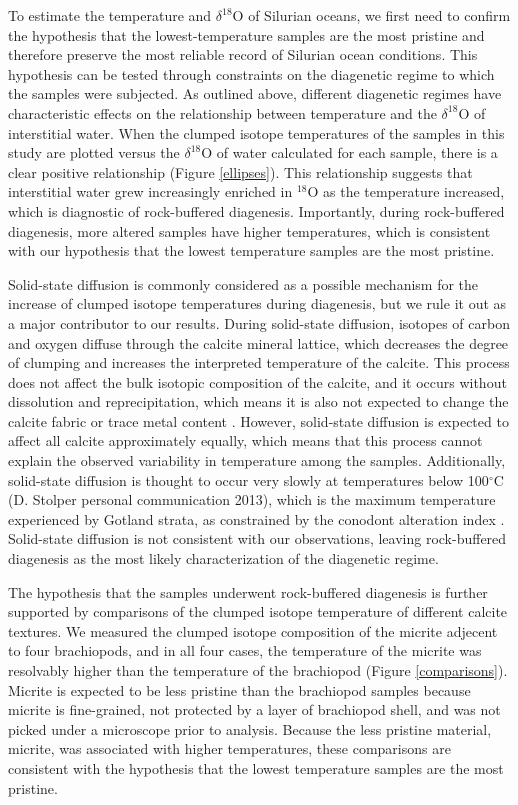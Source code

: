 \documentclass{article}
\newcommand{\deltao}{$\delta^{18}$}
\newcommand{\degrees}{$^{\circ}$}
\begin{document}
To estimate the temperature and \deltao O of Silurian oceans, we first need to confirm the hypothesis that the lowest-temperature samples are the most pristine and therefore preserve the most reliable record of Silurian ocean conditions. This hypothesis can be tested through constraints on the diagenetic regime to which the samples were subjected. As outlined above, different diagenetic regimes have characteristic effects on the relationship between temperature and the \deltao O of interstitial water. When the clumped isotope temperatures of the samples in this study are plotted versus the \deltao O of water calculated for each sample, there is a clear positive relationship (Figure \ref{ellipses}). This relationship suggests that interstitial water grew increasingly enriched in $^{18}$O as the temperature increased, which is diagnostic of rock-buffered diagenesis. Importantly, during rock-buffered diagenesis, more altered samples have higher temperatures, which is consistent with our hypothesis that the lowest temperature samples are the most pristine.

Solid-state diffusion is commonly considered as a possible mechanism for the increase of clumped isotope temperatures during diagenesis, but we rule it out as a major contributor to our results. During solid-state diffusion, isotopes of carbon and oxygen diffuse through the calcite mineral lattice, which decreases the degree of clumping and increases the interpreted temperature of the calcite. This process does not affect the bulk isotopic composition of the calcite, and it occurs without dissolution and reprecipitation, which means it is also not expected to change the calcite fabric or trace metal content \citep{Eiler2011}. However, solid-state diffusion is expected to affect all calcite approximately equally, which means that this process cannot explain the observed variability in temperature among the samples. Additionally, solid-state diffusion is thought to occur very slowly at temperatures below 100\degrees C (D. Stolper personal communication 2013), which is the maximum temperature experienced by Gotland strata, as constrained by the conodont alteration index \citep{Jeppsson1983,Wenzel2000}. Solid-state diffusion is not consistent with our observations, leaving rock-buffered diagenesis as the most likely characterization of the diagenetic regime.

The hypothesis that the samples underwent rock-buffered diagenesis is further supported by comparisons of the clumped isotope temperature of different calcite textures. We measured the clumped isotope composition of the micrite adjecent to four brachiopods, and in all four cases, the temperature of the micrite was resolvably higher than the temperature of the brachiopod (Figure \ref{comparisons}). Micrite is expected to be less pristine than the brachiopod samples because micrite is fine-grained, not protected by a layer of brachiopod shell, and was not picked under a microscope prior to analysis. Because the less pristine material, micrite, was associated with higher temperatures, these comparisons are consistent with the hypothesis that the lowest temperature samples are the most pristine.
\end{document}
